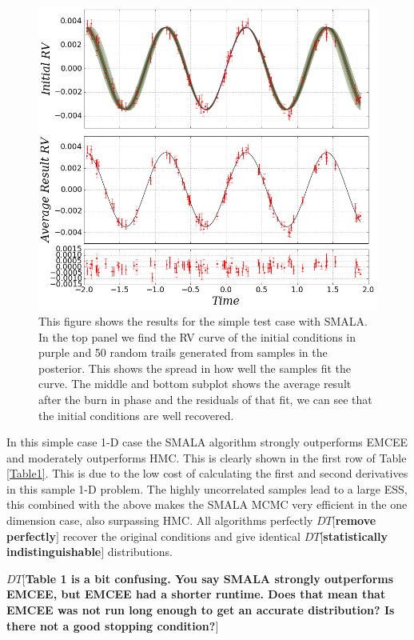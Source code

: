 \documentclass{aa}
\def\memodt#1{\color{green}$DT[${\bf #1}$]$ \color{black}}
\begin{document}
\begin{figure}
\centering
\includegraphics[width=0.95\hsize]{rv1-1.png}
   \caption{This figure shows the results for the simple test case with SMALA. 
In the top panel we find the RV curve of the initial conditions in purple and 50 random trails generated from samples in the posterior. 
This shows the spread in how well the samples fit the curve. 
The middle and bottom subplot shows the average result after the burn in phase and the residuals of that fit, we can see that the initial conditions are well recovered.}
      \label{FigSimple}
\end{figure}

In this simple case 1-D case the SMALA algorithm strongly outperforms EMCEE and moderately outperforms HMC. 
This is clearly shown in the first row of Table \ref{Table1}.
This is due to the low cost of calculating the first and second derivatives in this sample 1-D problem. 
The highly uncorrelated samples lead to a large ESS, this combined with the above makes the SMALA MCMC very efficient in the one dimension case, also surpassing HMC. All algorithms perfectly \memodt{remove perfectly} recover the original conditions and give identical \memodt{statistically indistinguishable} distributions.

\memodt{Table 1 is a bit confusing. You say SMALA strongly outperforms EMCEE, but EMCEE had a shorter runtime. Does that mean that EMCEE was not run long enough to get an accurate distribution? Is there not a good stopping condition?}
\end{document}
